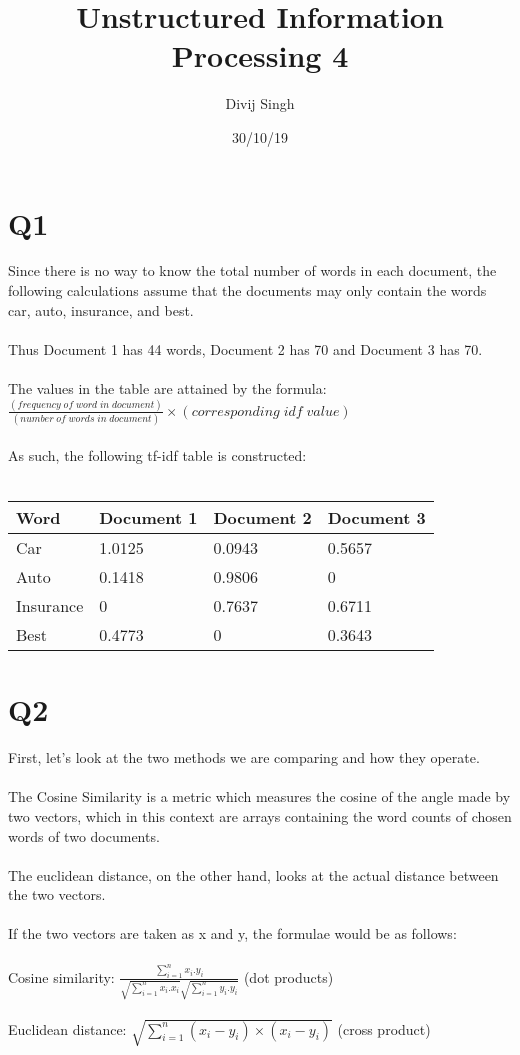 \documentclass{article}
\title{Unstructured Information Processing 4}
\author{Divij Singh}
\date{30/10/19}
\begin{document}
\maketitle
	
\section{Q1}
Since there is no way to know the total number of words in each document, the following calculations assume that the documents may only contain the words car, auto, insurance, and best.\\\\
Thus Document 1 has 44 words, Document 2 has 70 and Document 3 has 70.\\\\
The values in the table are attained by the formula:\\ $\frac{(frequency\;of\; word\; in\; document)}{(number\; of \;words\; in\; document)} \times (corresponding \;idf\; value)$\\\\
As such, the following tf-idf table is constructed:\\\\

\begin{tabular}{llll}
Word      & Document 1 & Document 2 & Document 3 \\
\hline
Car       & 1.0125     & 0.0943     & 0.5657     \\
Auto      & 0.1418     & 0.9806     & 0          \\
Insurance & 0          & 0.7637     & 0.6711     \\
Best      & 0.4773     & 0          & 0.3643    
\end{tabular}


\section{Q2}
First, let's look at the two methods we are comparing and how they operate.\\\\
The Cosine Similarity is a metric which measures the cosine of the angle made by two vectors, which in this context are arrays containing the word counts of chosen words of two documents.\\\\
The euclidean distance, on the other hand, looks at the actual distance between the two vectors.\\\\
If the two vectors are taken as x and y, the formulae would be as follows:\\\\
Cosine similarity: $ \frac{\sum^{n}_{i=1} x_i.y_i}{\sqrt{\sum^{n}_{i=1} x_i.x_i}\sqrt{\sum^{n}_{i=1} y_i.y_i}}$ (dot products)\\\\
Euclidean distance: $\sqrt{\sum^{n}_{i=1} (x_i - y_i) \times (x_i - y_i)}$ (cross product)\\\\
\end{document}
